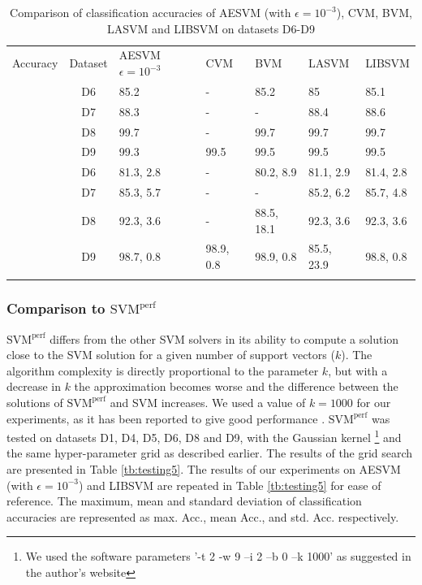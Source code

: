 \documentclass[twoside]{article}
\begin{document}
\begin{table}[h!]
\begin{center}
\begin{tabular}{|@{}p{1.57cm}!{\vrule width 1pt}@{}c@{}!{\vrule width 1pt}@{}p{1.5cm}|@{}p{1.4cm}|@{}p{1.6cm}|@{}p{1.57cm}|@{}p{1.4cm}|} \hline
Accuracy& Dataset& AESVM $\epsilon = 10^{-3}$ & CVM & BVM & LASVM &LIBSVM\\ 
&D6 & 85.2 & - & 85.2 & 85 &85.1\\ 
&D7 & 88.3 & - & - & 88.4 & 88.6 \\ 
&D8 & 99.7 & - & 99.7 & 99.7 & 99.7 \\ 
&D9 & 99.3 & 99.5 & 99.5 & 99.5 & 99.5 \\ 
&D6 & 81.3, 2.8 & - & 80.2, 8.9 & 81.1, 2.9 & 81.4, 2.8\\ 
&D7 & 85.3, 5.7 & - & - & 85.2, 6.2 & 85.7, 4.8\\ 
&D8 & 92.3, 3.6 & - & 88.5, 18.1 & 92.3, 3.6 & 92.3, 3.6 \\ 
&D9 & 98.7, 0.8 & 98.9, 0.8 & 98.9, 0.8 & 85.5, 23.9 & 98.8, 0.8 \\ 
\end{tabular}
\end{center}
\caption{Comparison of classification accuracies of AESVM (with $\epsilon = 10^{-3}$), CVM, BVM, LASVM and LIBSVM on datasets D6-D9}
\label{tb:testing4}
\end{table}

\subsubsection{Comparison to $\text{SVM}^{\mathrm{perf}}$}
$\text{SVM}^{\text{perf}}$ differs from the other SVM solvers in its ability to compute a solution close to the SVM solution for a given number of support vectors ($k$). The algorithm complexity is directly proportional to the parameter $k$, but with a decrease in $k$ the approximation becomes worse and the difference between the solutions of  $\text{SVM}^{\text{perf}}$ and SVM increases. We used a value of $k = 1000$ for our experiments, as it has been reported to give good performance \citep{Joachims09}. $\text{SVM}^{\text{perf}}$ was tested on datasets D1, D4, D5, D6, D8 and D9, with the Gaussian kernel \footnote{We used the software parameters '-t 2 -w 9 --i 2 --b 0 --k 1000' as suggested in the author's website} and the same hyper-parameter grid as described earlier. The results of the grid search are presented in Table \ref{tb:testing5}. The results of our experiments on AESVM (with $\epsilon = 10^{-3}$) and LIBSVM are repeated in Table \ref{tb:testing5} for ease of reference. The maximum, mean and standard deviation of classification accuracies are represented as max. Acc., mean Acc., and std. Acc. respectively.
\end{document}
